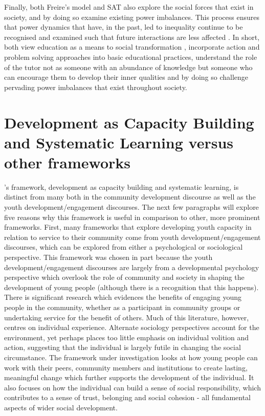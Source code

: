 Finally, both Freire's model and SAT also explore the social forces that exist in society, and by doing so examine existing power imbalances. This process ensures that power dynamics that have, in the past, led to inequality continue to be recognised and examined such that future interactions are less affected \citep{Arbab1988,Freire1969}. In short, both view education as a means to social transformation \citep{Kwauk2016}, incorporate action and problem solving approaches into basic educational practices, understand the role of the tutor not as someone with an abundance of knowledge but someone who can encourage them to develop their inner qualities and by doing so challenge pervading power imbalances that exist throughout society. 
\newpage













\section{Development as Capacity Building and Systematic Learning versus other frameworks}



\citeauthor{Karlberg2016}'s framework, development as capacity building and systematic learning, is distinct from many both in the community development discourse as well as the youth development/engagement discourses. The next few paragraphs will explore five reasons why this framework is useful in comparison to other, more prominent frameworks. First, many frameworks that explore developing youth capacity in relation to service to their community come from youth development/engagement discourses, which can be explored from either a psychological or sociological perspective. This framework was chosen in part because the youth development/engagement discourses are largely from a developmental psychology perspective which overlook the role of community and society in shaping the development of young people (although there is a recognition that this happens). There is significant research which evidences the benefits of engaging young people in the community, whether as a participant in community groups or undertaking service for the benefit of others. Much of this literature, however, centres on individual experience. Alternate sociology perspectives account for the environment, yet perhaps places too little emphasis on individual volition and action, suggesting that the individual is largely futile in changing the social circumstance. The framework under investigation looks at how young people can work with their peers, community members and institutions to create lasting, meaningful change which further supports the development of the individual. It also focuses on how the individual can build a sense of social responsibility, which contributes to a sense of trust, belonging and social cohesion - all fundamental aspects of wider social development.

